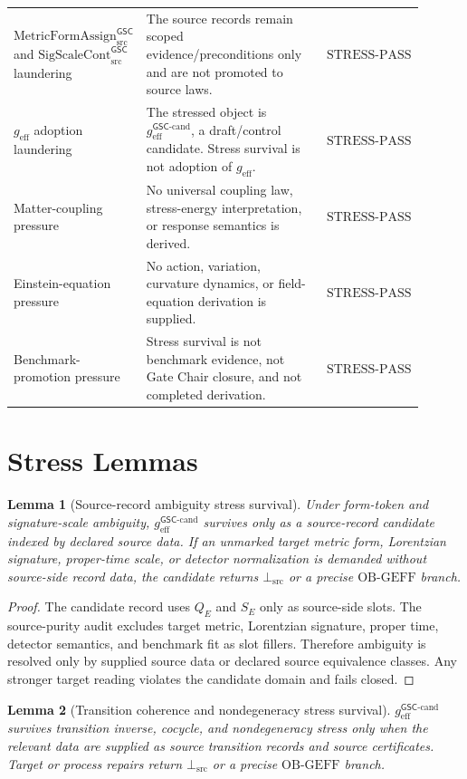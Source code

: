 \documentclass[11pt]{article}
\newcommand{\SigScaleCont}{\mathrm{SigScaleCont}^{\mathsf{GSC}}_{\mathrm{src}}}
\newcommand{\MetricFormAssign}{\mathrm{MetricFormAssign}^{\mathsf{GSC}}_{\mathrm{src}}}
\newcommand{\geff}{g_{\mathrm{eff}}}
\newcommand{\geffCand}{g_{\mathrm{eff}}^{\mathsf{GSC}\mbox{-}\mathrm{cand}}}
\newcommand{\BottomSrc}{\bot_{\mathrm{src}}}
\newcommand{\OBGEFF}{\mathrm{OB\mbox{-}GEFF}}
\newcommand{\StressPass}{\mathrm{STRESS\mbox{-}PASS}}
\newtheorem{lemma}{Lemma}
\begin{document}
\begin{longtable}{p{0.26\linewidth}p{0.46\linewidth}p{0.18\linewidth}}
\(\MetricFormAssign\) and \(\SigScaleCont\) laundering & The source records
remain scoped evidence/preconditions only and are not promoted to source
laws. & \(\StressPass\) \\
\(\geff\) adoption laundering & The stressed object is \(\geffCand\), a
draft/control candidate. Stress survival is not adoption of \(\geff\). &
\(\StressPass\) \\
Matter-coupling pressure & No universal coupling law, stress-energy
interpretation, or response semantics is derived. & \(\StressPass\) \\
Einstein-equation pressure & No action, variation, curvature dynamics, or
field-equation derivation is supplied. & \(\StressPass\) \\
Benchmark-promotion pressure & Stress survival is not benchmark evidence, not
Gate Chair closure, and not completed derivation. & \(\StressPass\) \\
\bottomrule
\end{longtable}

\section{Stress Lemmas}

\begin{lemma}[Source-record ambiguity stress survival]
Under form-token and signature-scale ambiguity, \(\geffCand\) survives only
as a source-record candidate indexed by declared source data. If an unmarked
target metric form, Lorentzian signature, proper-time scale, or detector
normalization is demanded without source-side record data, the candidate
returns \(\BottomSrc\) or a precise \(\OBGEFF\) branch.
\end{lemma}

\begin{proof}
The candidate record uses \(Q_E\) and \(S_E\) only as source-side slots. The
source-purity audit excludes target metric, Lorentzian signature, proper time,
detector semantics, and benchmark fit as slot fillers. Therefore ambiguity is
resolved only by supplied source data or declared source equivalence classes.
Any stronger target reading violates the candidate domain and fails closed.
\end{proof}

\begin{lemma}[Transition coherence and nondegeneracy stress survival]
\(\geffCand\) survives transition inverse, cocycle, and nondegeneracy stress
only when the relevant data are supplied as source transition records and
source certificates. Target or process repairs return \(\BottomSrc\) or a
precise \(\OBGEFF\) branch.
\end{lemma}
\end{document}

